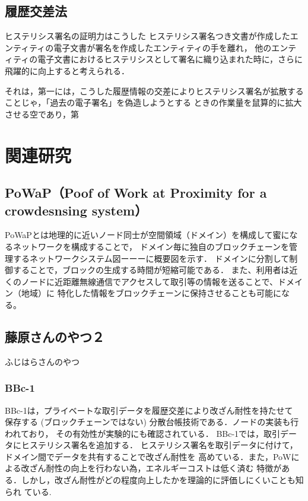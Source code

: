 \documentclass[a4paper,12pt]{jsarticle}
\begin{document}


      \subsection{履歴交差法}
ヒステリシス署名の証明力はこうした
ヒステリシス署名つき文書が作成したエンティティの電子文書が署名を作成したエンティティの手を離れ，
他のエンティティの電子文書におけるヒステリシスとして署名に織り込まれた時に，さらに飛躍的に向上すると考えられる．

それは，第一には，こうした履歴情報の交差によりヒステリシス署名が拡散することじゃ，「過去の電子署名」を偽造しようとする
ときの作業量を鼠算的に拡大させる空であり，第


\section{関連研究}
      \subsection{PoWaP（Poof of Work at Proximity for a crowdesnsing system）}
PoWaPとは地理的に近いノード同士が空間領域（ドメイン）を構成して蜜になるネットワークを構成することで，
ドメイン毎に独自のブロックチェーンを管理するネットワークシステム図ーーーに概要図を示す．
ドメインに分割して制御することで，ブロックの生成する時間が短縮可能である．
また、利用者は近くのノードに近距離無線通信でアクセスして取引等の情報を送ることで、ドメイン（地域）に
特化した情報をブロックチェーンに保持させることも可能になる。



      \subsection{藤原さんのやつ２}
ふじはらさんのやつ

      \subsubsection{BBc-1}

BBc-1\cite{saito}は，プライベートな取引データを履歴交差により改ざん耐性を持たせて
保存する (ブロックチェーンではない) 分散台帳技術である．ノードの実装も行われており，
その有効性が実験的にも確認されている．
BBc-1では，取引データにヒステリシス署名を追加する．
ヒステリシス署名を取引データに付けて，ドメイン間でデータを共有することで改ざん耐性を
高めている．また，PoWによる改ざん耐性の向上を行わない為，エネルギーコストは低く済む
特徴がある．しかし，改ざん耐性がどの程度向上したかを理論的に評価しにくいことも知られ
ている. 
\end{document}
